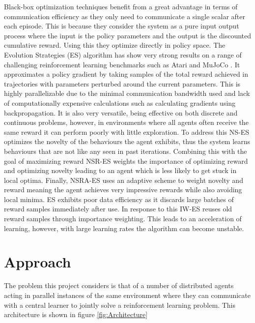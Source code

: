 Black-box optimization techniques benefit from a great advantage in terms of communication efficiency as they only need to communicate a single scalar after each episode. This is because they consider the system as a pure input output process where the input is the policy parameters and the output is the discounted cumulative reward. Using this they optimize directly in policy space.
The Evolution Strategies (ES) \cite{ES} algorithm has show very strong results on a range of challenging reinforcement learning benchmarks such as Atari \cite{Atari} and MuJoCo \cite{MuJoCo}. It approximates a policy gradient by taking samples of the total reward achieved in trajectories with parameters perturbed around the current parameters. This is highly parallelizable due to the minimal communication bandwidth used and lack of computationally expensive calculations such as calculating gradients using backpropagation. It is also very versatile, being effective on both discrete and continuous problems, however, in environments where all agents often receive the same reward it can perform poorly with little exploration. 
To address this NS-ES \cite{NS-ES} optimizes the novelty of the behaviours the agent exhibits, thus the system learns behaviours that are not like any seen in past iterations. Combining this with the goal of maximizing reward NSR-ES weights the importance of optimizing reward and optimizing novelty leading to an agent which is less likely to get stuck in local optima. Finally, NSRA-ES uses an adaptive scheme to weight novelty and reward meaning the agent achieves very impressive rewards while also avoiding local minima.
ES exhibits poor data efficiency as it discards large batches of reward samples immediately after use. In response to this IW-ES \cite{IWES} reuses old reward samples through importance weighting. This leads to an acceleration of learning, however, with large learning rates the algorithm can become unstable.



\section{Approach}
The problem this project considers is that of a number of distributed agents acting in parallel instances of the same environment where they can communicate with a central learner to jointly solve a reinforcement learning problem. 
This architecture is shown in figure \ref{fig:Architecture}

